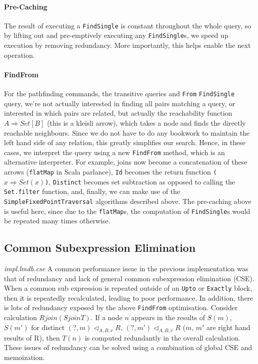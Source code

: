 \documentclass[12pt,a4paper,twoside,openright]{report}
\newcommand\codeName[1]{\texttt{#1}}
\newcommand\note[1]{\textit{#1}}
\newcommand{\opRule}[3]{#1 \triangleleft_{#2, v} #3}
\begin{document}
		\paragraph{Pre-Caching}
		The result of executing a \codeName{FindSingle} is constant throughout the whole query, so by lifting out and pre-emptively executing any \codeName{FindSingle}s, we speed up execution by removing redundancy. More importantly, this helps enable the next operation.
		
		\paragraph{FindFrom}
		For the pathfinding commands, the transitive queries and \codeName{From} \codeName{FindSingle} query, we're not actually interested in finding all pairs matching a query, or interested in which pairs are related, but actually the reachability function \codeName{$A \Rightarrow Set[B]$} (this is a kleisli arrow), which takes a node and finds the directly reachable neighbours. Since we do not have to do any bookwork to maintain the left hand side of any relation, this greatly simplifies our search. Hence, in these cases, we interpret the query using a new \codeName{FindFrom} method, which is an alternative interpreter. For example, joins now become a concatenation of these arrows (\codeName{flatMap}  in Scala parlance), \codeName{Id} becomes the return function \codeName{($x \Rightarrow Set(x)$)}, \codeName{Distinct} becomes set subtraction as opposed to calling the \codeName{Set.filter} function, and, finally, we can make use of the \codeName{SimpleFixedPointTraversal} algorithms described above. The pre-caching above is useful here, since due to the \codeName{flatMap}s, the computation of \codeName{FindSingle}s would be repeated many times otherwise.

	\subsection{Common Subexpression Elimination}
	\note{impl.lmdb.cse}
	A common performance issue in the previous implementation was that of redundancy and lack of general common subexpression elimination (CSE). When a common sub expression is repeated outside of an \codeName{Upto} or \codeName{Exactly} block, then it is repeatedly recalculated, leading to poor performance. In addition, there is lots of redundancy exposed by the above \codeName{FindFrom} optimisation. Consider calculation $R join (S join T)$. If a node $n$ appears in the results of $S(m)$, $S(m')$ for distinct $\opRule{(?, m)}{A, B}{R}$, $\opRule{(?, m')}{A, B}{R}$ ($m$, $m'$ are right hand results of R), then $T(n)$ is computed redundantly in the overall calculation. These issues of redundancy can be solved using a combination of global CSE and memoization.
\end{document}
